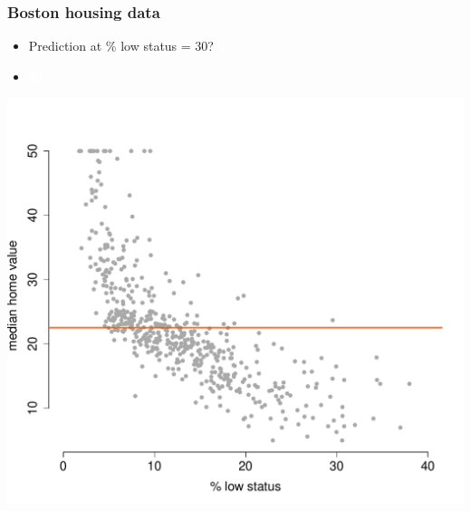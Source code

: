 \documentclass{beamer}
\newcommand{\bo}[1]{\textcolor{burntorange}{#1}}
\begin{document}
\begin{frame}[plain]
\frametitle{Boston housing data}
\vspace{5mm}
\begin{itemize}
\item[] Prediction at \bo{\% low status} = 30? \textcolor{white}{fill}
\item[] \textcolor{white}{fill}
\end{itemize}
\vspace{-16mm}
\begin{center}
\includegraphics[scale=.39]{DaveBostonplot1.pdf}
\end{center}

\end{frame}
\end{document}
